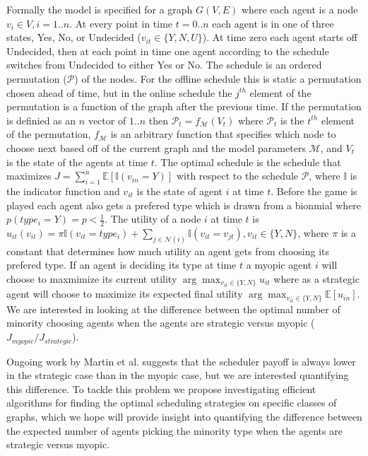 \documentclass{article}
\begin{document}
Formally the model is specified for a graph $G(V,E)$ where each agent
is a node $v_i \in V, i={1..n}$. At every point in time $t={0..n}$
each agent is in one of three states, Yes, No, or Undecided ($v_{it}
\in \{Y, N, U\}$). At time zero each agent starts off Undecided, then
at each point in time one agent according to the schedule switches
from Undecided to either Yes or No. The schedule is an ordered
permutation ($\mathcal P$) of the nodes. For the offline schedule this
is static a permutation chosen ahead of time, but in the online
schedule the $j^{th}$ element of the permutation is a function of the
graph after the previous time. If the permutation is definied as an
$n$ vector of ${1..n}$ then $\mathcal P_t = f_{\mathcal M}(V_t)$ where
$\mathcal P_t$ is the $t^{th}$ element of the permutation,
$f_{\mathcal M}$ is an arbitrary function that specifies which node to
choose next based off of the current graph and the model parameters
$\mathcal M$, and $V_t$ is the state of the agents at time $t$. The
optimal schedule is the schedule that maximizes $J = \sum_{i=1}^n
\mathbb E[\mathbb I(v_{in} = Y)]$ with respect to the schedule
$\mathcal P$, where $\mathbb I$ is the indicator function and $v_{it}$
is the state of agent $i$ at time $t$. Before the game is played each
agent also gets a prefered type which is drawn from a bionmial where
$p(type_i = Y) = p < \frac{1}{2}$. The utility of a node $i$ at time
$t$ is $u_{it}(v_{it}) = \pi \mathbb I(v_{it} = type_i) + \sum_{j \in
  \mathcal N(i)} \mathbb I(v_{it} = v_{jt}), v_{it} \in \{Y, N\}$,
where $\pi$ is a constant that determines how much utility an agent
gets from choosing its prefered type. If an agent is deciding its type
at time $t$ a myopic agent $i$ will choose to maxmimize its current
utility $\arg\max_{v_{it} \in \{Y, N\}} u_{it}$ where as a strategic
agent will choose to maximize its expected final utility
$\arg\max_{v_{it} \in \{Y, N\}} \mathbb E[u_{in}]$. We are interested
in looking at the difference between the optimal number of minority
choosing agents when the agents are strategic versus myopic
($J_{myopic} / J_{strategic}$).

Ongoing work by Martin et al. suggests that the scheduler payoff is
always lower in the strategic case than in the myopic case, but we are
interested quantifying this difference. To tackle this problem we
propose investigating efficient algorithms for finding the optimal
scheduling strategies on specific classes of graphs, which we hope
will provide insight into quantifying the difference between the
expected number of agents picking the minority type when the agents
are strategic versus myopic.
\end{document}
